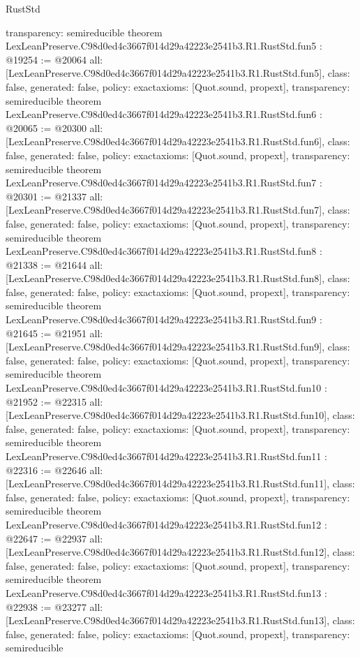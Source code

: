 \begin{lexlean}{RustStd}
\begin{coremodule}
{  transparency: semireducible
}
theorem LexLeanPreserve.C98d0ed4c3667f014d29a42223e2541b3.R1.RustStd.fun5 : @19254 := @20064 {
  all: [LexLeanPreserve.C98d0ed4c3667f014d29a42223e2541b3.R1.RustStd.fun5],
  class: false,
  generated: false,
  policy: exact{axioms: [Quot.sound, propext]},
  transparency: semireducible
}
theorem LexLeanPreserve.C98d0ed4c3667f014d29a42223e2541b3.R1.RustStd.fun6 : @20065 := @20300 {
  all: [LexLeanPreserve.C98d0ed4c3667f014d29a42223e2541b3.R1.RustStd.fun6],
  class: false,
  generated: false,
  policy: exact{axioms: [Quot.sound, propext]},
  transparency: semireducible
}
theorem LexLeanPreserve.C98d0ed4c3667f014d29a42223e2541b3.R1.RustStd.fun7 : @20301 := @21337 {
  all: [LexLeanPreserve.C98d0ed4c3667f014d29a42223e2541b3.R1.RustStd.fun7],
  class: false,
  generated: false,
  policy: exact{axioms: [Quot.sound, propext]},
  transparency: semireducible
}
theorem LexLeanPreserve.C98d0ed4c3667f014d29a42223e2541b3.R1.RustStd.fun8 : @21338 := @21644 {
  all: [LexLeanPreserve.C98d0ed4c3667f014d29a42223e2541b3.R1.RustStd.fun8],
  class: false,
  generated: false,
  policy: exact{axioms: [Quot.sound, propext]},
  transparency: semireducible
}
theorem LexLeanPreserve.C98d0ed4c3667f014d29a42223e2541b3.R1.RustStd.fun9 : @21645 := @21951 {
  all: [LexLeanPreserve.C98d0ed4c3667f014d29a42223e2541b3.R1.RustStd.fun9],
  class: false,
  generated: false,
  policy: exact{axioms: [Quot.sound, propext]},
  transparency: semireducible
}
theorem LexLeanPreserve.C98d0ed4c3667f014d29a42223e2541b3.R1.RustStd.fun10 : @21952 := @22315 {
  all: [LexLeanPreserve.C98d0ed4c3667f014d29a42223e2541b3.R1.RustStd.fun10],
  class: false,
  generated: false,
  policy: exact{axioms: [Quot.sound, propext]},
  transparency: semireducible
}
theorem LexLeanPreserve.C98d0ed4c3667f014d29a42223e2541b3.R1.RustStd.fun11 : @22316 := @22646 {
  all: [LexLeanPreserve.C98d0ed4c3667f014d29a42223e2541b3.R1.RustStd.fun11],
  class: false,
  generated: false,
  policy: exact{axioms: [Quot.sound, propext]},
  transparency: semireducible
}
theorem LexLeanPreserve.C98d0ed4c3667f014d29a42223e2541b3.R1.RustStd.fun12 : @22647 := @22937 {
  all: [LexLeanPreserve.C98d0ed4c3667f014d29a42223e2541b3.R1.RustStd.fun12],
  class: false,
  generated: false,
  policy: exact{axioms: [Quot.sound, propext]},
  transparency: semireducible
}
theorem LexLeanPreserve.C98d0ed4c3667f014d29a42223e2541b3.R1.RustStd.fun13 : @22938 := @23277 {
  all: [LexLeanPreserve.C98d0ed4c3667f014d29a42223e2541b3.R1.RustStd.fun13],
  class: false,
  generated: false,
  policy: exact{axioms: [Quot.sound, propext]},
  transparency: semireducible
}
\end{coremodule}
\end{lexlean}
